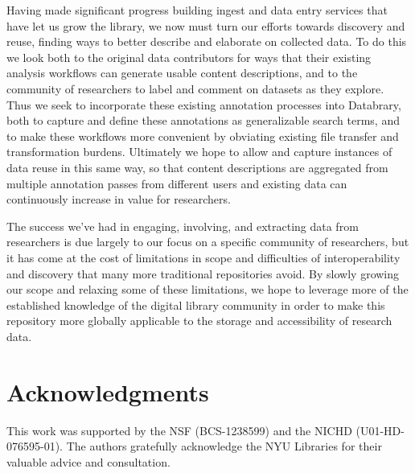 \documentclass{sig-alternate}
\begin{document}
Having made significant progress building ingest and data entry services that have let us grow the library, we now must turn our efforts towards discovery and reuse, finding ways to better describe and elaborate on collected data.
To do this we look both to the original data contributors for ways that their existing analysis workflows can generate usable content descriptions, and to the community of researchers to label and comment on datasets as they explore.
Thus we seek to incorporate these existing annotation processes into Databrary, both to capture and define these annotations as generalizable search terms, and to make these workflows more convenient by obviating existing file transfer and transformation burdens.
Ultimately we hope to allow and capture instances of data reuse in this same way, so that content descriptions are aggregated from multiple annotation passes from different users and existing data can continuously increase in value for researchers.

The success we've had in engaging, involving, and extracting data from researchers is due largely to our focus on a specific community of researchers, but it has come at the cost of limitations in scope and difficulties of interoperability and discovery that many more traditional repositories avoid.
By slowly growing our scope and relaxing some of these limitations, we hope to leverage more of the established knowledge of the digital library community in order to make this repository more globally applicable to the storage and accessibility of research data.

\section*{Acknowledgments}

This work was supported by the NSF (BCS-1238599) and the NICHD (U01-HD-076595-01).
The authors gratefully acknowledge the NYU Libraries for their valuable advice and consultation.



\end{document}
